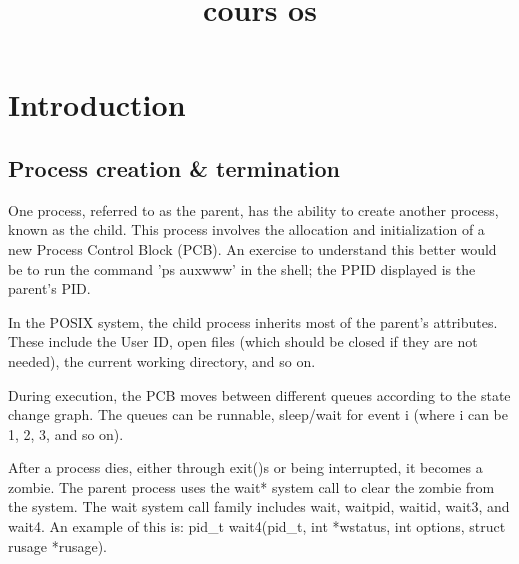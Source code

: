 \documentclass[12pt]{report}
\title{cours os }
\author{}
\begin{document}
\maketitle
\tableofcontents
\newpage

\section{Introduction}
\subsection*{Process creation \& termination}

One process, referred to as the parent, has the ability to create another process, known as the child. This process involves the allocation and initialization of a new Process Control Block (PCB). An exercise to understand this better would be to run the command 'ps auxwww' in the shell; the PPID displayed is the parent's PID.

In the POSIX system, the child process inherits most of the parent's attributes. These include the User ID, open files (which should be closed if they are not needed), the current working directory, and so on.

During execution, the PCB moves between different queues according to the state change graph. The queues can be runnable, sleep/wait for event i (where i can be 1, 2, 3, and so on).

After a process dies, either through exit()s or being interrupted, it becomes a zombie. The parent process uses the wait* system call to clear the zombie from the system. The wait system call family includes wait, waitpid, waitid, wait3, and wait4. An example of this is: pid_t wait4(pid_t, int *wstatus, int options, struct rusage *rusage).
\end{document}
